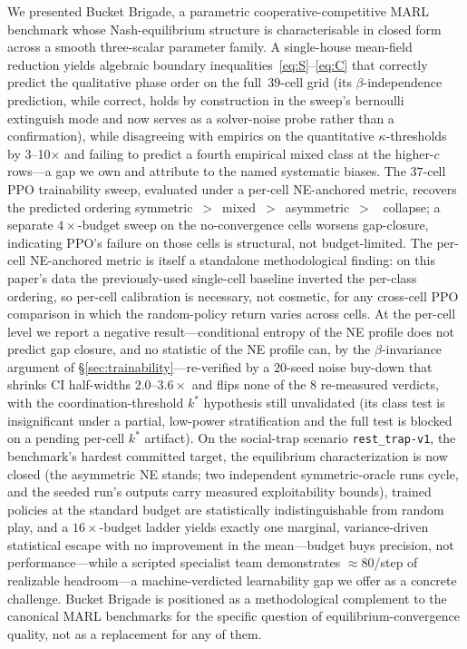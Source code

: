 \documentclass{anvil-paper}
\begin{document}
We presented Bucket Brigade, a parametric cooperative-competitive MARL
benchmark whose Nash-equilibrium structure is characterisable in closed form
across a smooth three-scalar parameter family. A single-house mean-field
reduction yields algebraic boundary inequalities~\eqref{eq:S}--\eqref{eq:C}
that correctly predict the qualitative phase order on the full~$39$-cell
grid (its $\beta$-independence prediction, while correct, holds by
construction in the sweep's bernoulli extinguish mode and now serves as
a solver-noise probe rather than a confirmation), while disagreeing with
empirics on the quantitative
$\kappa$-thresholds by 3--10$\times$ and failing to predict a fourth
empirical \textsf{mixed} class at the higher-$c$ rows---a gap we own and
attribute to the named systematic biases. The $37$-cell PPO trainability
sweep, evaluated under a per-cell NE-anchored metric, recovers the
predicted ordering
\textsf{symmetric}~$>$~\textsf{mixed}~$>$~\textsf{asymmetric}~$>$~%
\textsf{collapse}; a separate $4{\times}$-budget sweep on the
no-convergence cells worsens gap-closure, indicating PPO's failure on those
cells is structural, not budget-limited. The per-cell NE-anchored metric is itself a
standalone methodological finding: on this paper's data the previously-used
single-cell baseline inverted the per-class ordering, so per-cell
calibration is necessary, not cosmetic, for any cross-cell PPO comparison
in which the random-policy return varies across cells. At the per-cell
level we report a negative result---conditional entropy of the NE
profile does not predict gap closure, and no statistic of the NE profile
can, by the $\beta$-invariance argument of
\S\ref{sec:trainability}---re-verified by a $20$-seed noise buy-down
that shrinks CI half-widths $2.0$--$3.6{\times}$ and flips none of the
$8$ re-measured verdicts, with the coordination-threshold $k^{*}$
hypothesis still unvalidated (its class test is insignificant under a
partial, low-power stratification and the full test is blocked on a
pending per-cell $k^{*}$ artifact). On the
social-trap scenario \texttt{rest\_trap-v1}, the benchmark's hardest
committed target, the equilibrium characterization is now closed (the
asymmetric NE stands; two independent symmetric-oracle runs cycle, and
the seeded run's outputs carry measured exploitability bounds), trained
policies at the standard budget are statistically
indistinguishable from random play, and a $16{\times}$-budget ladder
yields exactly one marginal, variance-driven statistical escape with no
improvement in the mean---budget buys precision, not
performance---while a scripted specialist team
demonstrates ${\approx}80$/step of realizable headroom---a
machine-verdicted learnability gap we offer as a concrete challenge.
Bucket Brigade is positioned as a methodological
complement to the canonical MARL benchmarks for the specific question of
equilibrium-convergence quality, not as a replacement for any of them.
\end{document}
